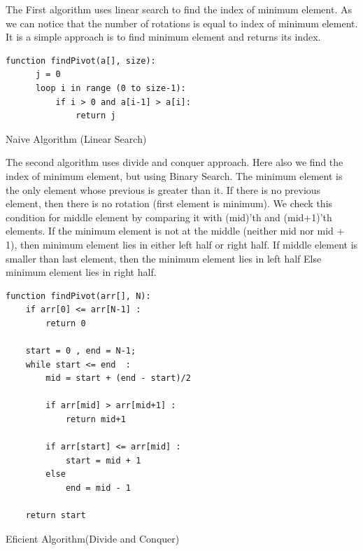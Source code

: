 \documentclass[conference]{IEEEtran}
\begin{document}
The First algorithm uses linear search to find the index of minimum element. As we can notice that the number of rotations is equal to index of minimum element. It is a simple approach is to find minimum element and returns its index.

\bigskip

\begin{algorithm}[H]
\begin{lstlisting}
function findPivot(a[], size):
      j = 0
      loop i in range (0 to size-1):
          if i > 0 and a[i-1] > a[i]:
              return j
\end{lstlisting}

 \caption{Naive Algorithm (Linear Search) }
\end{algorithm}

\bigskip
The second algorithm uses divide and conquer approach. Here also we find the index of minimum element, but using Binary Search.
\newline The minimum element is the only element whose previous is greater than it.
\newline If there is no previous element, then there is no rotation (first element is minimum).
\newline We check this condition for middle element by comparing it with (mid)’th and (mid+1)’th elements.
\newline If the minimum element is not at the middle (neither mid nor mid + 1), then minimum element lies in either left half or right half.
\newline If middle element is smaller than last element, then the minimum element lies in left half
\newline Else minimum element lies in right half.
\bigskip


\bigskip

\begin{algorithm}[H]
\begin{lstlisting}
function findPivot(arr[], N):
    if arr[0] <= arr[N-1] :
        return 0

    start = 0 , end = N-1;
    while start <= end  :
        mid = start + (end - start)/2

        if arr[mid] > arr[mid+1] :
            return mid+1

        if arr[start] <= arr[mid] :
            start = mid + 1
        else
            end = mid - 1

    return start
\end{lstlisting}

 \caption{Eficient Algorithm(Divide and Conquer)}
\end{algorithm}
\bigskip
\newpage
\end{document}
